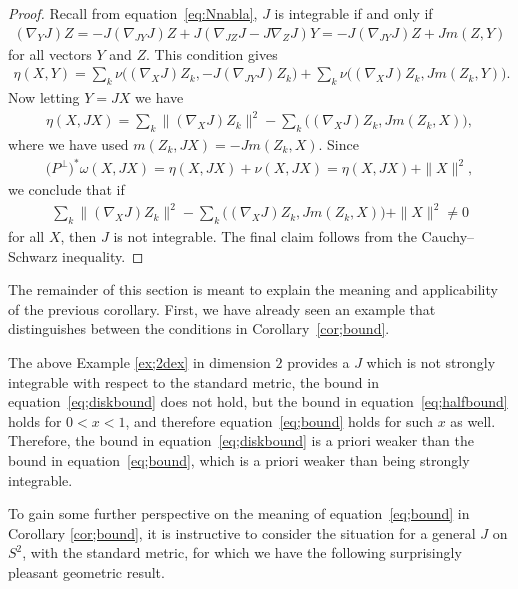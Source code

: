 \documentclass[pdftex]{sigma}
\numberwithin{equation}{section}
\begin{document}
\begin{proof}Recall from equation~\eqref{eq:Nnabla}, $J$ is integrable if and only if
\begin{gather*}
 (\nabla_Y J) Z = -J (\nabla_{JY} J ) Z + J (\nabla_{JZ} J - J \nabla_Z J)Y = -J ( \nabla_{JY} J) Z + Jm(Z,Y)
\end{gather*}
for all vectors $Y$ and $Z$. This condition gives
\begin{gather*}
\eta(X,Y)=\sum_k \nu \big((\nabla_X J) Z_k, -J ( \nabla_{JY} J ) Z_k\big)+\sum_k \nu \big( (\nabla_X J) Z_k, J m(Z_k,Y) \big).
\end{gather*}
Now letting $Y=JX$ we have
\begin{gather*}
\eta(X,JX) = \sum_k \| (\nabla_X J) Z_k \|^2- \sum_k \big( (\nabla_X J) Z_k, Jm(Z_k,X) \big),
\end{gather*}
where we have used $m(Z_k,JX) = -Jm(Z_k,X)$. Since
\begin{gather*}
\big(P^\perp\big)^*\omega(X,JX) =\eta(X,JX) + \nu( X , JX ) = \eta(X,JX) + \|X\|^2,
\end{gather*}
we conclude that if
\begin{gather*}
 \sum_k \| (\nabla_X J) Z_k \|^2-\sum_k \big( (\nabla_X J) Z_k, Jm(Z_k,X) \big) + \|X\|^2 \neq 0
\end{gather*}
for all $X$, then $J$ is not integrable. The final claim follows from the Cauchy--Schwarz inequa\-lity.
\end{proof}

The remainder of this section is meant to explain the meaning and applicability of the previous corollary. First, we have already seen an example that distinguishes between the conditions in Corollary~\ref{cor;bound}.

\begin{ex} The above Example \ref{ex;2dex} in dimension $2$ provides a $J$ which is not strongly integrable with respect to the standard metric, the bound in equation~\eqref{eq;diskbound} does not hold, but the bound in equation~\eqref{eq;halfbound} holds for $0 < x < 1$, and therefore equation~\eqref{eq;bound} holds for such $x$ as well. Therefore, the bound in equation~\eqref{eq;diskbound} is a priori weaker than the bound in equation~\eqref{eq;bound}, which is a priori weaker than being strongly integrable.
\end{ex}

 To gain some further perspective on the meaning of equation~\eqref{eq;bound} in Corollary \ref{cor;bound}, it is instructive to consider the situation for a general $J$ on $S^2$, with the standard metric, for which we have the following surprisingly pleasant geometric result.
\end{document}
